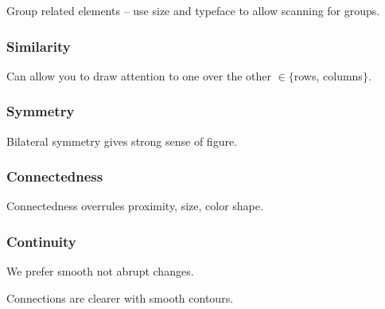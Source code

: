Group related elements -- use size and typeface to allow scanning for groups.

\subsubsection{Similarity}
Can allow you to draw attention to one over the other $\in\{$rows, columns$\}$.

\subsubsection{Symmetry}
Bilateral symmetry gives strong sense of figure.

\subsubsection{Connectedness}
Connectedness overrules proximity, size, color shape.

\subsubsection{Continuity}
We prefer smooth not abrupt changes.

Connections are clearer with smooth contours.

